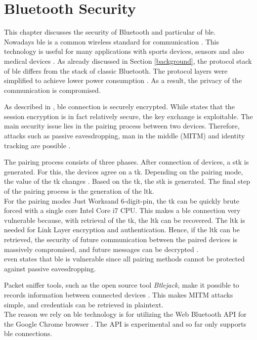\section{Bluetooth Security} \label{bluetooth}
This chapter discusses the security of Bluetooth and particular of \gls{ble}. \\
Nowadays \gls{ble} is a common wireless standard for communication \cite{IntroductionBLE}. This technology is useful for many applications with sports devices, sensors and also medical devices \cite{Ryan13}.
As already discussed in Section \ref{background}, the protocol stack of \gls{ble} differs from the stack of classic Bluetooth. The protocol layers were simplified to achieve lower power consumption \cite{Ryan13}. As a result, the privacy of the communication is compromised.

As described in \cite{GomezOP12}, \gls{ble} connection is securely encrypted. While \cite{Ryan13} states that the session encryption is in fact relatively secure, the key exchange is exploitable. The main security issue lies in the pairing process between two devices. Therefore, attacks such as passive eavesdropping, man in the middle (MITM) and identity tracking are possible \cite{IntroductionBLE}.

The pairing process consists of three phases. After connection of devices, a \gls{stk} is generated. For this, the devices agree on a \gls{tk}. Depending on the pairing mode, the value of the \gls{tk} changes \cite{Ryan13}. Based on the \gls{tk}, the \gls{stk} is generated. The final step of the pairing process is the generation of the \gls{ltk}. \\
For the pairing modes Just Works\texttrademark and 6-digit-pin, the \gls{tk} can be quickly brute forced with a single core Intel Core i7 CPU. This makes a \gls{ble} connection very vulnerable because, with retrieval of the \gls{tk}, the \gls{ltk} can be recovered. The \gls{ltk} is needed for Link Layer encryption and authentication. Hence, if the \gls{ltk} can be retrieved, the security of future communication between the paired devices is massively compromised, and future messages can be decrypted \cite{Ryan13}. \\
\cite{GomezOP12} even states that \gls{ble} is vulnerable since all pairing methods cannot be protected against passive eavesdropping. 

Packet sniffer tools, such as the open source tool \textit{Btlejack}, make it possible to records information between connected devices \cite{BtleJack}. This makes MITM attacks simple, and credentials can be retrieved in plaintext. \\
The reason we rely on \gls{ble} technology is for utilizing the Web Bluetooth API for the Google Chrome browser \cite{WebBTAPI}. The API is experimental and so far only supports \gls{ble} connections. 

